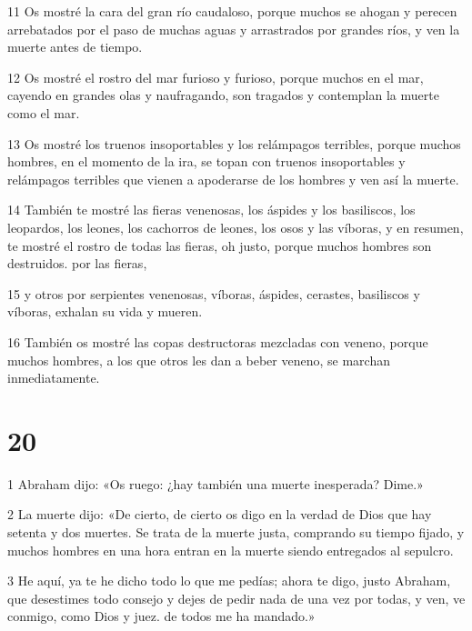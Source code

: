 \par 11 Os mostré la cara del gran río caudaloso, porque muchos se ahogan y perecen arrebatados por el paso de muchas aguas y arrastrados por grandes ríos, y ven la muerte antes de tiempo.

\par 12 Os mostré el rostro del mar furioso y furioso, porque muchos en el mar, cayendo en grandes olas y naufragando, son tragados y contemplan la muerte como el mar.

\par 13 Os mostré los truenos insoportables y los relámpagos terribles, porque muchos hombres, en el momento de la ira, se topan con truenos insoportables y relámpagos terribles que vienen a apoderarse de los hombres y ven así la muerte.

\par 14 También te mostré las fieras venenosas, los áspides y los basiliscos, los leopardos, los leones, los cachorros de leones, los osos y las víboras, y en resumen, te mostré el rostro de todas las fieras, oh justo, porque muchos hombres son destruidos. por las fieras,

\par 15 y otros por serpientes venenosas, víboras, áspides, cerastes, basiliscos y víboras, exhalan su vida y mueren.

\par 16 También os mostré las copas destructoras mezcladas con veneno, porque muchos hombres, a los que otros les dan a beber veneno, se marchan inmediatamente.

\chapter{20}

\par 1 Abraham dijo: «Os ruego: ¿hay también una muerte inesperada? Dime.»

\par 2 La muerte dijo: «De cierto, de cierto os digo en la verdad de Dios que hay setenta y dos muertes. Se trata de la muerte justa, comprando su tiempo fijado, y muchos hombres en una hora entran en la muerte siendo entregados al sepulcro.

\par 3 He aquí, ya te he dicho todo lo que me pedías; ahora te digo, justo Abraham, que desestimes todo consejo y dejes de pedir nada de una vez por todas, y ven, ve conmigo, como Dios y juez. de todos me ha mandado.»

